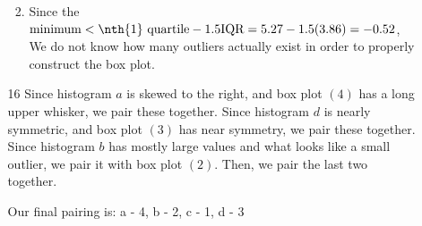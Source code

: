 \documentclass[12pt,letterpaper]{article}
\begin{document}
\begin{enumerate}
\begin{enumerate}
\begin{enumerate}[label=(\arabic*)]

            \item

              Since the $\text{minimum} < \text{\nth{1} quartile} - 1.5 \text{IQR} = 5.27 - 1.5(3.86) = -0.52$,
              We do not know how many outliers actually exist in order to properly construct the box plot.
          \end{enumerate}
        \item [16]
          Since histogram $a$ is skewed to the right, and box plot $(4)$ has a long upper whisker, we pair these together.
          Since histogram $d$ is nearly symmetric, and box plot $(3)$ has near symmetry, we pair these together.
          Since histogram $b$ has mostly large values and what looks like a small outlier, we pair it with box plot $(2)$.
          Then, we pair the last two together.

          Our final pairing is: a - 4, b - 2, c - 1, d - 3
      \end{enumerate}
  \end{enumerate}
\end{document}
